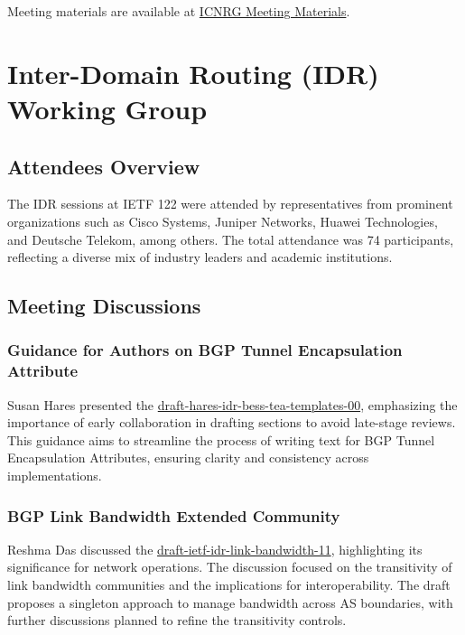 \documentclass{article}
\begin{document}
Meeting materials are available at \href{https://datatracker.ietf.org/meeting/122/session/icnrg}{ICNRG Meeting Materials}.



\newpage

\section{Inter-Domain Routing (IDR) Working Group}

\subsection{Attendees Overview}

The IDR sessions at IETF 122 were attended by representatives from prominent organizations such as Cisco Systems, Juniper Networks, Huawei Technologies, and Deutsche Telekom, among others. The total attendance was 74 participants, reflecting a diverse mix of industry leaders and academic institutions.

\subsection{Meeting Discussions}

\subsubsection{Guidance for Authors on BGP Tunnel Encapsulation Attribute}

Susan Hares presented the \href{https://datatracker.ietf.org/doc/html/draft-hares-idr-bess-tea-templates-00}{draft-hares-idr-bess-tea-templates-00}, emphasizing the importance of early collaboration in drafting sections to avoid late-stage reviews. This guidance aims to streamline the process of writing text for BGP Tunnel Encapsulation Attributes, ensuring clarity and consistency across implementations.

\subsubsection{BGP Link Bandwidth Extended Community}

Reshma Das discussed the \href{https://datatracker.ietf.org/doc/html/draft-ietf-idr-link-bandwidth-11}{draft-ietf-idr-link-bandwidth-11}, highlighting its significance for network operations. The discussion focused on the transitivity of link bandwidth communities and the implications for interoperability. The draft proposes a singleton approach to manage bandwidth across AS boundaries, with further discussions planned to refine the transitivity controls.
\end{document}

